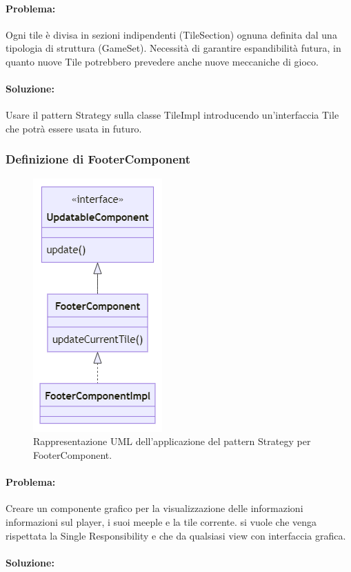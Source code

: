 \paragraph{Problema:}
Ogni tile è divisa in sezioni indipendenti (TileSection) ognuna definita dal una tipologia di struttura (GameSet). Necessità di garantire espandibilità futura, in quanto nuove Tile potrebbero prevedere anche nuove meccaniche di gioco.
\paragraph{Soluzione:}
Usare il pattern Strategy sulla classe TileImpl introducendo un'interfaccia Tile che potrà essere usata in futuro.
\clearpage

\subsubsection*{Definizione di FooterComponent}
\begin{figure}[ht]
    \centering\includegraphics[]{images/FooterComponent_uml.png}
    \caption{Rappresentazione UML dell'applicazione del pattern Strategy per FooterComponent.}
\end{figure}
\paragraph{Problema:}
Creare un componente grafico per la visualizzazione delle informazioni informazioni sul player, i suoi meeple e la tile corrente. si vuole che venga rispettata la Single Responsibility e che da qualsiasi view con interfaccia grafica.
\paragraph{Soluzione:}
\clearpage

